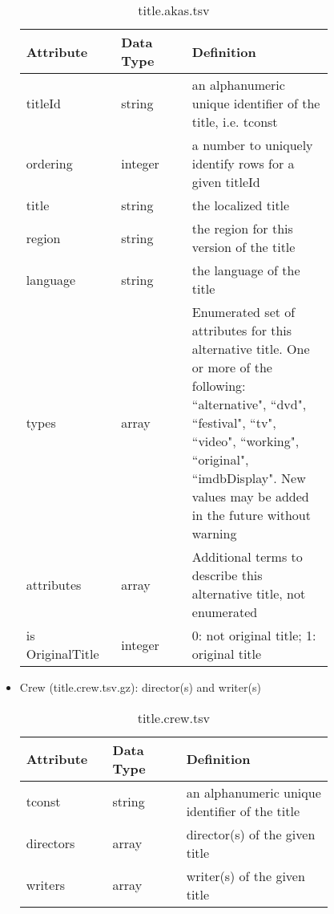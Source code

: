 \documentclass[10pt,titlepage]{article}
\begin{document}
\begin{itemize}
        \begin{table}[H]
            \centering
            \begin{tabular}{p{0.2\linewidth} | p{0.2\linewidth} | p{0.4\linewidth}}
                \hline
                \textbf{Attribute} & \textbf{Data Type}  & \textbf{Definition}\\
                \hline
                titleId & string & an alphanumeric unique identifier of the title, i.e. tconst \\
                \hline
                ordering & integer & a number to uniquely identify rows for a given titleId \\
                \hline
                title & string & the localized title \\
                \hline
                region & string & the region for this version of the title \\
                \hline
                language & string & the language of the title \\
                \hline
                types & array & Enumerated set of attributes for this alternative title. One or more of the following:
                ``alternative", ``dvd",  ``festival", ``tv", ``video", ``working", ``original",  ``imdbDisplay". New values may
                be added in the  future without warning \\
                \hline
                attributes & array & Additional terms to describe this alternative title, not  enumerated \\
                \hline
                is OriginalTitle & integer & 0: not original title; 1: original title \\
                \hline
            \end{tabular}
            \caption{title.akas.tsv}
            \label{tab:imdb_akas}
        \end{table}

    \item Crew (title.crew.tsv.gz): director(s) and writer(s)

        \begin{table}[H]
            \centering
            \begin{tabular}{p{0.2\linewidth} | p{0.2\linewidth} | p{0.4\linewidth}}
                \hline
                \textbf{Attribute} & \textbf{Data Type}  & \textbf{Definition}\\
                \hline
                tconst & string & an alphanumeric unique identifier of the title \\
                \hline
                directors & array & director(s) of the given title \\
                \hline
                writers & array & writer(s) of the given title \\
                \hline
            \end{tabular}
            \caption{title.crew.tsv}
            \label{tab:imdb_crew}
        \end{table}


\end{itemize}
\end{document}
